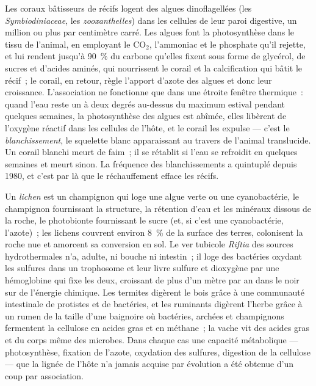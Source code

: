 \begin{definition}\label{def:b3:microbiomes:coral}
Les coraux bâtisseurs de récifs logent des algues dinoflagellées (les
\emph{Symbiodiniaceae}, les \emph{zooxanthelles}) dans les cellules de
leur paroi digestive, un million ou plus par centimètre carré. Les
algues font la photosynthèse dans le tissu de l'animal, en employant le
CO$_{2}$, l'ammoniac et le phosphate qu'il rejette, et lui rendent
jusqu'à \qty{90}{\%} du carbone qu'elles fixent sous forme de glycérol,
de sucres et d'acides aminés, qui nourrissent le corail et la
calcification qui bâtit le récif~; le corail, en retour, règle l'apport
d'azote des algues et donc leur croissance. L'association ne fonctionne
que dans une étroite fenêtre thermique~: quand l'eau reste un à deux
degrés au-dessus du maximum estival pendant quelques semaines, la
photosynthèse des algues est abîmée, elles libèrent de l'oxygène
réactif dans les cellules de l'hôte, et le corail les expulse --- c'est
le \emph{blanchissement}, le squelette blanc apparaissant au travers de
l'animal translucide. Un corail blanchi meurt de faim~; il se rétablit
si l'eau se refroidit en quelques semaines et meurt sinon. La fréquence
des blanchissements a quintuplé depuis 1980, et c'est par là que le
réchauffement efface les récifs.
\end{definition}

\begin{example}\label{ex:b3:microbiomes:habitats}
Un \emph{lichen} est un champignon qui loge une algue verte ou une
cyanobactérie, le champignon fournissant la structure, la rétention
d'eau et les minéraux dissous de la roche, le photobionte fournissant
le sucre (et, si c'est une cyanobactérie, l'azote)~; les lichens
couvrent environ \qty{8}{\%} de la surface des terres, colonisent la
roche nue et amorcent sa conversion en sol. Le ver tubicole
\emph{Riftia} des sources hydrothermales n'a, adulte, ni bouche ni
intestin~; il loge des bactéries oxydant les sulfures dans un
trophosome et leur livre sulfure et dioxygène par une hémoglobine qui
fixe les deux, croissant de plus d'un mètre par an dans le noir sur de
l'énergie chimique. Les termites digèrent le bois grâce à une
communauté intestinale de protistes et de bactéries, et les ruminants
digèrent l'herbe grâce à un rumen de la taille d'une baignoire où
bactéries, archées et champignons fermentent la cellulose en acides
gras et en méthane~; la vache vit des acides gras et du corps même des
microbes. Dans chaque cas une capacité métabolique --- photosynthèse,
fixation de l'azote, oxydation des sulfures, digestion de la cellulose
--- que la lignée de l'hôte n'a jamais acquise par évolution a été
obtenue d'un coup par association.
\end{example}

